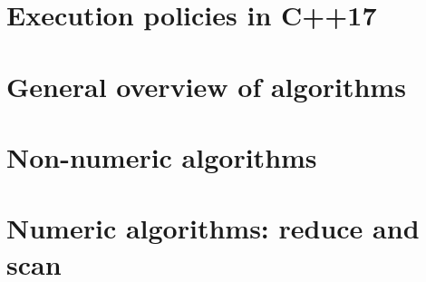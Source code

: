 \section{Execution policies in C++17}


\section{General overview of algorithms}


\section{Non-numeric algorithms}


\section{Numeric algorithms: reduce and scan}


